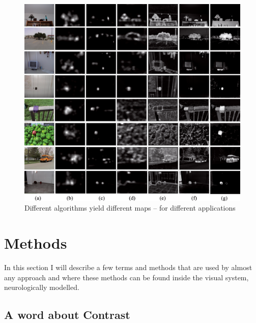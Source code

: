 \documentclass[a4paper,12pt,fleqn,oneside]{scrartcl}
\begin{document}
\begin{figure}
    \centering
    \includegraphics{examples.png}

    \caption[\url{http://opticalengineering.spiedigitallibrary.org/data/Journals/OPTICE/23430/057008_1_6.png}]{Different
    algorithms yield different maps -- for different applications}
    \label{fig:examples}
\end{figure}


\section{Methods}

In this section I will describe a few terms and methods that are used by almost any approach and where these methods can
be found inside the visual system, neurologically modelled.

\subsection{A word about Contrast}
\end{document}
